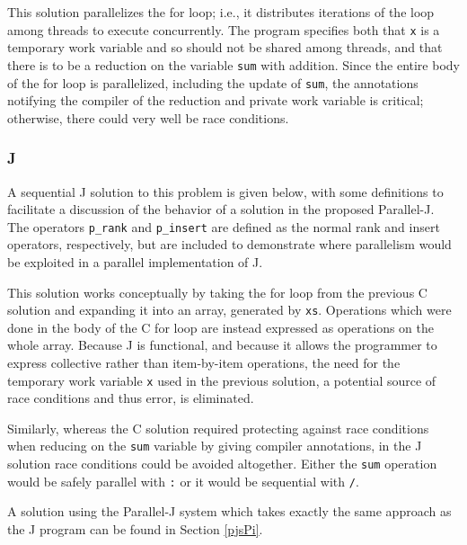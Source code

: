 \noindent This solution parallelizes the for loop; 
i.e., it distributes iterations of the loop among threads to execute concurrently.
The program specifies both that \texttt{x} is a temporary work variable and so should not be shared among threads, 
and that there is to be a reduction on the variable \texttt{sum} with addition. 
Since the entire body of the for loop is parallelized, including the update of \texttt{sum}, 
the annotations notifying the compiler of the reduction and private work variable is critical; 
otherwise, there could very well be race conditions.

\subsubsection{J}
A sequential J solution to this problem is given below, 
with some definitions to facilitate a discussion 
of the behavior of a solution in the proposed Parallel-J. 
The operators \texttt{p\_rank} and \texttt{p\_insert}
are defined as the normal rank and insert operators, respectively,  
but are included to demonstrate where parallelism would be exploited in a parallel implementation of J.

\begin{singlespacing}
\begin{small}

\end{small}
\end{singlespacing}

This solution works conceptually by taking the for loop from the previous C solution 
and expanding it into an array, generated by \texttt{xs}.
Operations which were done in the body of the C for loop 
are instead expressed as operations on the whole array. 
Because J is functional, and 
because it allows the programmer to express collective rather than item-by-item operations, 
the need for the temporary work variable \texttt{x} used in the previous solution, 
a potential source of race conditions and thus error, is eliminated. 

Similarly, whereas the C solution required 
protecting against race conditions when reducing on the \texttt{sum} variable
by giving compiler annotations, 
in the J solution race conditions could be avoided altogether.
Either the \texttt{sum} operation would be safely parallel with \texttt{\::} or 
it would be sequential with \texttt{/}.

A solution using the Parallel-J system which takes exactly the same approach as the J program 
can be found in Section \ref{pjsPi}.

